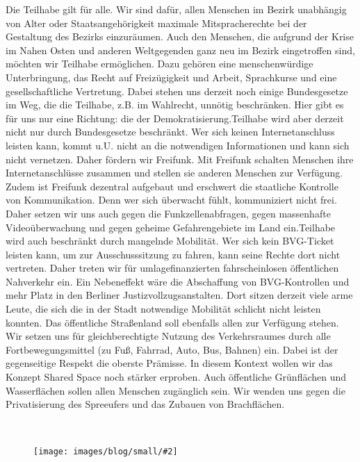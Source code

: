 \documentclass[a4paper,10pt]{article}
\newcommand{\mysection}[1]{{\vspace{1cm}\noindent\color{gray}{\ttfamily\LARGE\raggedright #1}\\\medskip}}
\newcommand{\abschnitt}[2]{%
\mysection{\raggedright #1}%
\begin{figure}[t]%
\vspace*{-2.7cm}%
\hspace*{-2.1cm}%
\texttt{[image: images/blog/small/\#2]} %
\end{figure}%
}
\begin{document}
\enlargethispage{1em}
Die Teilhabe gilt für alle. Wir sind dafür, allen Menschen im Bezirk
unabhängig von Alter oder Staatsangehörigkeit maximale Mitspracherechte
bei der Gestaltung des Bezirks einzuräumen. Auch den Menschen, die
aufgrund der Krise im Nahen Osten und anderen Weltgegenden ganz neu im
Bezirk eingetroffen sind, möchten wir Teilhabe ermöglichen. Dazu gehören
eine menschenwürdige Unterbringung, das Recht auf Freizügigkeit und
Arbeit, Sprachkurse und eine gesellschaftliche Vertretung. Dabei stehen
uns derzeit noch einige Bundesgesetze im Weg, die die Teilhabe, z.B. im
Wahlrecht, unnötig beschränken. Hier gibt es für uns nur eine Richtung:
die der Demokratisierung.Teilhabe wird aber derzeit nicht nur durch
Bundesgesetze beschränkt. 
Wer sich keinen Internetanschluss leisten
kann, kommt u.U. nicht an die notwendigen Informationen und kann sich
nicht vernetzen. Daher fördern wir Freifunk. Mit Freifunk schalten
Menschen ihre Internetanschlüsse zusammen und stellen sie anderen
Menschen zur Verfügung. Zudem ist Freifunk dezentral aufgebaut und
erschwert die staatliche Kontrolle von Kommunikation. Denn wer sich
überwacht fühlt, kommuniziert nicht frei. Daher setzen wir uns auch
gegen die Funkzellenabfragen, gegen massenhafte Videoüberwachung und
gegen geheime Gefahrengebiete im Land ein.Teilhabe wird auch beschränkt
durch mangelnde Mobilität. 
\enlargethispage{1em}
Wer sich kein BVG-Ticket leisten kann, um zur
Ausschusssitzung zu fahren, kann seine Rechte dort nicht vertreten.
Daher treten wir für umlagefinanzierten fahrscheinlosen öffentlichen
Nahverkehr ein. Ein Nebeneffekt wäre die Abschaffung von BVG-Kontrollen
und mehr Platz in den Berliner Justizvollzugsanstalten. Dort sitzen
derzeit viele arme Leute, die sich die in der Stadt notwendige Mobilität
schlicht nicht leisten konnten. Das öffentliche Straßenland soll
ebenfalls allen zur Verfügung stehen. Wir setzen uns für
gleichberechtigte Nutzung des Verkehrsraumes durch alle
Fortbewegungsmittel (zu Fuß, Fahrrad, Auto, Bus, Bahnen) ein. Dabei ist
der gegenseitige Respekt die oberste Prämisse. In diesem Kontext wollen
wir das Konzept Shared Space noch stärker erproben. Auch öffentliche
Grünflächen und Wasserflächen sollen allen Menschen zugänglich sein. Wir
wenden uns gegen die Privatisierung des Spreeufers und das Zubauen von
Brachflächen.

\abschnitt{}{plakat_katze.png}
\end{document}
